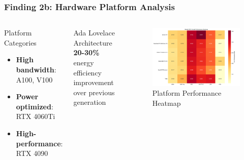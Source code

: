 \documentclass[aspectratio=169,xcolor=dvipsnames]{beamer}
\begin{document}
\begin{frame}
\frametitle{Finding 2b: Hardware Platform Analysis}

\begin{columns}[c]
\begin{block}{Platform Categories}
\begin{itemize}
\item \textbf{High bandwidth}: A100, V100
\item \textbf{Power optimized}: RTX 4060Ti
\item \textbf{High-performance}: RTX 4090
\end{itemize}
\end{block}

\vspace{0.5cm}
\begin{exampleblock}{Ada Lovelace Architecture}
\textbf{20-30\%} energy efficiency improvement over previous generation
\end{exampleblock}

\begin{figure}
\centering
\includegraphics[width=\textwidth]{img/overall_performance_heatmap.png}
\caption{Platform Performance Heatmap}
\end{figure}

\end{columns}
\end{frame}
\end{document}
